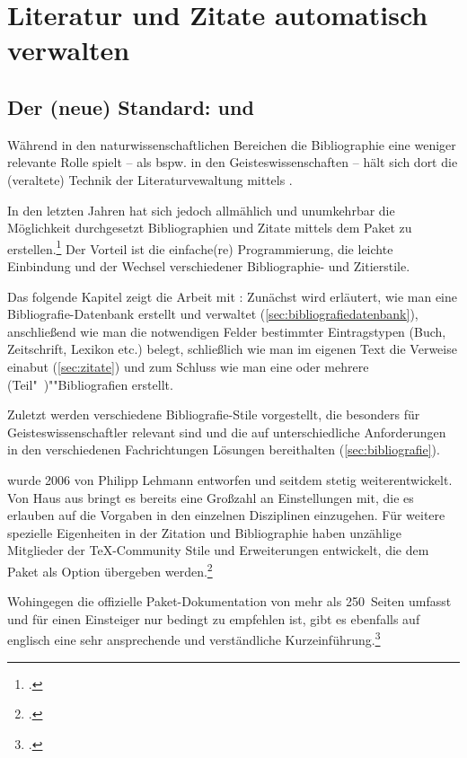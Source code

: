 \chapter{Literatur und Zitate automatisch verwalten}
\label{biblatex}

\section{Der (neue) Standard:  und }
Während in den naturwissenschaftlichen Bereichen die Bibliographie eine weniger relevante Rolle spielt -- als bspw. in den Geisteswissenschaften -- hält sich dort die (veraltete) Technik der Literaturvewaltung mittels \BibTeX.

In den letzten Jahren hat sich jedoch allmählich und unumkehrbar die Möglichkeit durchgesetzt Bibliographien und Zitate mittels dem Paket  zu erstellen.\footcite{wassenhoven:dtk2008/2,wassenhoven:dtk2008/4}
Der Vorteil ist die einfache(re) Programmierung, die leichte Einbindung und der Wechsel verschiedener Bibliographie- und Zitierstile.

Das folgende Kapitel zeigt die Arbeit mit : 
Zunächst wird erläutert, wie man eine Bibliografie-Datenbank erstellt und verwaltet (\cref{sec:bibliografiedatenbank}),
anschließend wie man die notwendigen Felder bestimmter Eintragstypen (Buch, Zeitschrift, Lexikon etc.) belegt, 
schließlich wie man im eigenen Text die Verweise einabut (\cref{sec:zitate}) und
zum Schluss wie man eine oder mehrere (Teil"~)""Bibliografien erstellt.

Zuletzt werden verschiedene Bibliografie-Stile vorgestellt,
die besonders für Geisteswissenschaftler relevant sind und die auf unterschiedliche Anforderungen in den verschiedenen Fachrichtungen Lösungen bereithalten (\cref{sec:bibliografie}).


 wurde 2006 %
von Philipp Lehmann entworfen und seitdem stetig weiterentwickelt. 
Von Haus aus bringt es bereits eine Großzahl an Einstellungen mit, 
die es erlauben auf die Vorgaben in den einzelnen Disziplinen einzugehen. 
Für weitere spezielle Eigenheiten in der Zitation und Bibliographie haben unzählige Mitglieder der \TeX -Community Stile und Erweiterungen entwickelt,
die dem  Paket als Option übergeben werden.\footcite{voss:bibliografien}


Wohingegen die offizielle Paket-Dokumentation von   mehr als 250~Seiten umfasst und  für einen Einsteiger nur bedingt zu empfehlen ist,
gibt es ebenfalls auf englisch eine sehr ansprechende und verständliche Kurzeinführung.\footcite{biblatex-tutorial}



